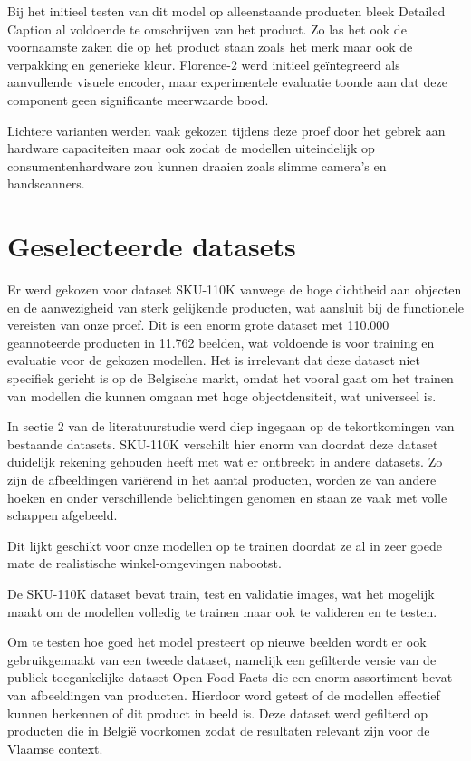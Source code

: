 Bij het initieel testen van dit model op alleenstaande producten bleek Detailed Caption al voldoende te omschrijven van het product. Zo las het ook de voornaamste zaken die op het product staan zoals het merk maar ook de verpakking en generieke kleur.
Florence-2 werd initieel geïntegreerd als aanvullende visuele encoder, maar experimentele evaluatie toonde aan dat deze component geen significante meerwaarde bood.

Lichtere varianten werden vaak gekozen tijdens deze proef door het gebrek aan hardware capaciteiten maar ook zodat de modellen uiteindelijk op consumentenhardware zou kunnen draaien zoals slimme camera's en handscanners.

\section{Geselecteerde datasets}
\label{sec:sel_datasets}

Er werd gekozen voor dataset SKU-110K \autocite{goldman2019dense} vanwege de hoge dichtheid aan objecten en de aanwezigheid van sterk gelijkende producten, wat aansluit bij de functionele vereisten van onze proef. Dit is een enorm grote dataset met 110.000 geannoteerde producten in 11.762 beelden, wat voldoende is voor training en evaluatie voor de gekozen modellen. Het is irrelevant dat deze dataset niet specifiek gericht is op de Belgische markt, omdat het vooral gaat om het trainen van modellen die kunnen omgaan met hoge objectdensiteit, wat universeel is.

In sectie 2 van de literatuurstudie werd diep ingegaan op de tekortkomingen van bestaande datasets. SKU-110K verschilt hier enorm van doordat deze dataset duidelijk rekening gehouden heeft met wat er ontbreekt in andere datasets. Zo zijn de afbeeldingen variërend in het aantal producten, worden ze van andere hoeken en onder verschillende belichtingen genomen en staan ze vaak met volle schappen afgebeeld.

Dit lijkt geschikt voor onze modellen op te trainen doordat ze al in zeer goede mate de realistische winkel-omgevingen nabootst.

De SKU-110K dataset bevat train, test en validatie images, wat het mogelijk maakt om de modellen volledig te trainen maar ook te valideren en te testen.

Om te testen hoe goed het model presteert op nieuwe beelden wordt er ook gebruikgemaakt van een tweede dataset, namelijk een gefilterde versie van de publiek toegankelijke dataset Open Food Facts \autocite{openfoodfacts} die een enorm assortiment bevat van afbeeldingen van producten. Hierdoor word getest of de modellen effectief kunnen herkennen of dit product in beeld is. Deze dataset werd gefilterd op producten die in België voorkomen zodat de resultaten relevant zijn voor de Vlaamse context.
